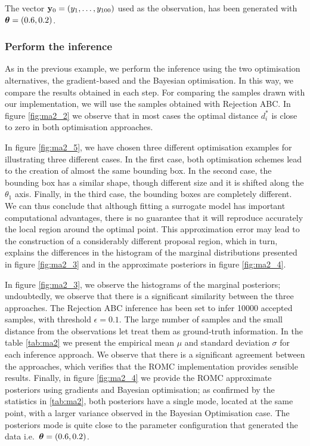 \noindent
The vector $\mathbf{y}_0 = (y_1, \ldots, y_{100})$ used as the observation,
has been generated with $\boldsymbol{\theta}=(0.6, 0.2)$.

\subsubsection*{Perform the inference}

As in the previous example, we perform the inference using the two
optimisation alternatives, the gradient-based and the Bayesian
optimisation. In this way, we compare the results obtained in each
step. For comparing the samples drawn with our implementation, we will
use the samples obtained with Rejection ABC. In figure \ref{fig:ma2_2}
we observe that in most cases the optimal distance $d_i^*$ is close to
zero in both optimisation approaches.

In figure \ref{fig:ma2_5}, we have chosen three different optimisation
examples for illustrating three different cases. In the first case,
both optimisation schemes lead to the creation of almost the same
bounding box. In the second case, the bounding box has a similar
shape, though different size and it is shifted along the $\theta_1$
axis. Finally, in the third case, the bounding boxes are completely
different. We can thus conclude that although fitting a surrogate
model has important computational advantages, there is no guarantee
that it will reproduce accurately the local region around the optimal
point. This approximation error may lead to the construction of a
considerably different proposal region, which in turn, explains the
differences in the histogram of the marginal distributions presented
in figure \ref{fig:ma2_3} and in the approximate posteriors in figure
\ref{fig:ma2_4}.

In figure \ref{fig:ma2_3}, we observe the histograms of the marginal
posteriors; undoubtedly, we observe that there is a significant
similarity between the three approaches. The Rejection ABC inference
has been set to infer 10000 accepted samples, with threshold
$\epsilon=0.1$. The large number of samples and the small distance
from the observations let treat them as ground-truth information. In
the table \ref{tab:ma2} we present the empirical mean $\mu$ and
standard deviation $\sigma$ for each inference approach. We observe
that there is a significant agreement between the approaches, which
verifies that the ROMC implementation provides sensible
results. Finally, in figure \ref{fig:ma2_4} we provide the ROMC
approximate posteriors using gradients and Bayesian optimisation; as
confirmed by the statistics in \ref{tab:ma2}, both posteriors have a
single mode, located at the same point, with a larger variance
observed in the Bayesian Optimisation case. The posteriors mode is
quite close to the parameter configuration that generated the data
i.e.\ $\boldsymbol{\theta} = (0.6, 0.2)$.

